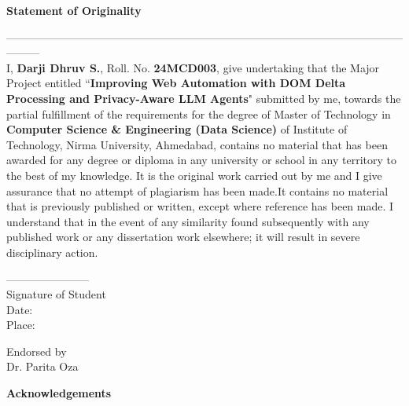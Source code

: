 \newpage
\vspace{4cm}
\begin{center}
{\Large \bf Statement of Originality}\\
\end{center}
\vspace{-0.6cm}
---------------------------------------------------------------------------------------------------------------------\\
\noindent I, \textbf{Darji Dhruv S.}, Roll. No. \textbf{24MCD003}, give undertaking that  the Major Project entitled ``\textbf{Improving Web Automation with DOM Delta Processing and Privacy-Aware LLM Agents}" submitted by me, towards the partial fulfillment of the requirements for the degree of Master of Technology in \textbf{Computer Science \& Engineering (Data Science)} of Institute of Technology, Nirma University, Ahmedabad, contains no material that has been awarded for any degree or diploma in any university or school in any territory to the best of my knowledge. It is the original work carried out by me and I give assurance that no attempt of plagiarism has been made.It contains no material that is previously published or written, except where reference has been made. I understand that in the event of any similarity found subsequently with any published work or any dissertation work elsewhere; it will result in severe disciplinary action.



\vspace{2cm}
-----------------------\\
Signature of Student\\
Date:\\
Place:\\
\begin{flushright}
Endorsed by \\
Dr. Parita Oza 
\end{flushright}



\newpage
{}
\begin{center}
{\Large \bf Acknowledgements}\\
\end{center}
\vspace{10pt}

